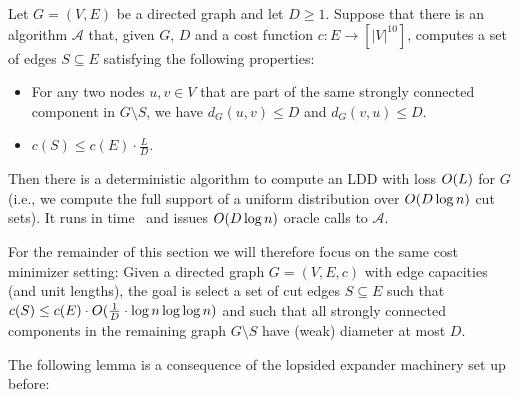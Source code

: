 \documentclass[letterpaper,11pt]{article}
\begin{document}
\begin{lemma}
Let $G = (V, E)$ be a directed graph and let $D \geq 1$. Suppose that there is an algorithm $\mathcal A$ that, given $G$, $D$ and a cost function $c : E \to [|V|^{10}]$, computes a set of edges $S \subseteq E$ satisfying the following properties:
\begin{itemize}
	\item For any two nodes $u, v \in V$ that are part of the same strongly connected component in $G \setminus S$, we have $d_G(u, v) \leq D$ and $d_G(v, u) \leq D$.
	\item $c(S) \leq c(E) \cdot \frac{L}{D}$.
\end{itemize}
Then there is a deterministic algorithm to compute an LDD with loss $O(L)$ for $G$ (i.e., we compute the full support of a uniform distribution over $O(D \log n)$ cut sets). It runs in time~ and issues $O(D \log n)$ oracle calls to $\mathcal A$.
\end{lemma}

For the remainder of this section we will therefore focus on the same cost minimizer setting: Given a directed graph $G = (V, E, c)$ with edge capacities (and unit lengths), the goal is select a set of cut edges $S \subseteq E$ such that $c(S) \leq c(E) \cdot O(\frac{1}{D} \cdot \log n \log\log n)$ and such that all strongly connected components in the remaining graph $G \setminus S$ have (weak) diameter at most $D$.

The following lemma is a consequence of the lopsided expander machinery set up before:
\end{document}
